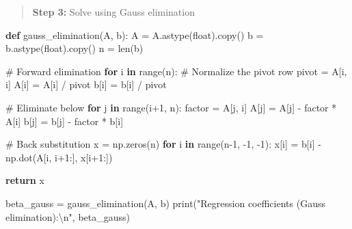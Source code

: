 \documentclass[
  letterpaper,
  DIV=11,
  numbers=noendperiod]{scrreprt}
\newenvironment{Shaded}{\begin{snugshade}}{\end{snugshade}}
\newcommand{\BuiltInTok}[1]{\textcolor[rgb]{0.00,0.23,0.31}{#1}}
\newcommand{\CharTok}[1]{\textcolor[rgb]{0.13,0.47,0.30}{#1}}
\newcommand{\CommentTok}[1]{\textcolor[rgb]{0.37,0.37,0.37}{#1}}
\newcommand{\ControlFlowTok}[1]{\textcolor[rgb]{0.00,0.23,0.31}{\textbf{#1}}}
\newcommand{\DecValTok}[1]{\textcolor[rgb]{0.68,0.00,0.00}{#1}}
\newcommand{\KeywordTok}[1]{\textcolor[rgb]{0.00,0.23,0.31}{\textbf{#1}}}
\newcommand{\NormalTok}[1]{\textcolor[rgb]{0.00,0.23,0.31}{#1}}
\newcommand{\OperatorTok}[1]{\textcolor[rgb]{0.37,0.37,0.37}{#1}}
\newcommand{\StringTok}[1]{\textcolor[rgb]{0.13,0.47,0.30}{#1}}
\begin{document}
\begin{quote}
\textbf{Step 3:} Solve using Gauss elimination
\end{quote}

\begin{Shaded}
\begin{Highlighting}[]
\KeywordTok{def}\NormalTok{ gauss\_elimination(A, b):}
\NormalTok{    A }\OperatorTok{=}\NormalTok{ A.astype(}\BuiltInTok{float}\NormalTok{).copy()}
\NormalTok{    b }\OperatorTok{=}\NormalTok{ b.astype(}\BuiltInTok{float}\NormalTok{).copy()}
\NormalTok{    n }\OperatorTok{=} \BuiltInTok{len}\NormalTok{(b)}
    
    \CommentTok{\# Forward elimination}
    \ControlFlowTok{for}\NormalTok{ i }\KeywordTok{in} \BuiltInTok{range}\NormalTok{(n):}
        \CommentTok{\# Normalize the pivot row}
\NormalTok{        pivot }\OperatorTok{=}\NormalTok{ A[i, i]}
\NormalTok{        A[i] }\OperatorTok{=}\NormalTok{ A[i] }\OperatorTok{/}\NormalTok{ pivot}
\NormalTok{        b[i] }\OperatorTok{=}\NormalTok{ b[i] }\OperatorTok{/}\NormalTok{ pivot}
        
        \CommentTok{\# Eliminate below}
        \ControlFlowTok{for}\NormalTok{ j }\KeywordTok{in} \BuiltInTok{range}\NormalTok{(i}\OperatorTok{+}\DecValTok{1}\NormalTok{, n):}
\NormalTok{            factor }\OperatorTok{=}\NormalTok{ A[j, i]}
\NormalTok{            A[j] }\OperatorTok{=}\NormalTok{ A[j] }\OperatorTok{{-}}\NormalTok{ factor }\OperatorTok{*}\NormalTok{ A[i]}
\NormalTok{            b[j] }\OperatorTok{=}\NormalTok{ b[j] }\OperatorTok{{-}}\NormalTok{ factor }\OperatorTok{*}\NormalTok{ b[i]}
    
    \CommentTok{\# Back substitution}
\NormalTok{    x }\OperatorTok{=}\NormalTok{ np.zeros(n)}
    \ControlFlowTok{for}\NormalTok{ i }\KeywordTok{in} \BuiltInTok{range}\NormalTok{(n}\OperatorTok{{-}}\DecValTok{1}\NormalTok{, }\OperatorTok{{-}}\DecValTok{1}\NormalTok{, }\OperatorTok{{-}}\DecValTok{1}\NormalTok{):}
\NormalTok{        x[i] }\OperatorTok{=}\NormalTok{ b[i] }\OperatorTok{{-}}\NormalTok{ np.dot(A[i, i}\OperatorTok{+}\DecValTok{1}\NormalTok{:], x[i}\OperatorTok{+}\DecValTok{1}\NormalTok{:])}
    
    \ControlFlowTok{return}\NormalTok{ x}

\NormalTok{beta\_gauss }\OperatorTok{=}\NormalTok{ gauss\_elimination(A, b)}
\BuiltInTok{print}\NormalTok{(}\StringTok{"Regression coefficients (Gauss elimination):}\CharTok{\textbackslash{}n}\StringTok{"}\NormalTok{, beta\_gauss)}
\end{Highlighting}
\end{Shaded}
\end{document}
